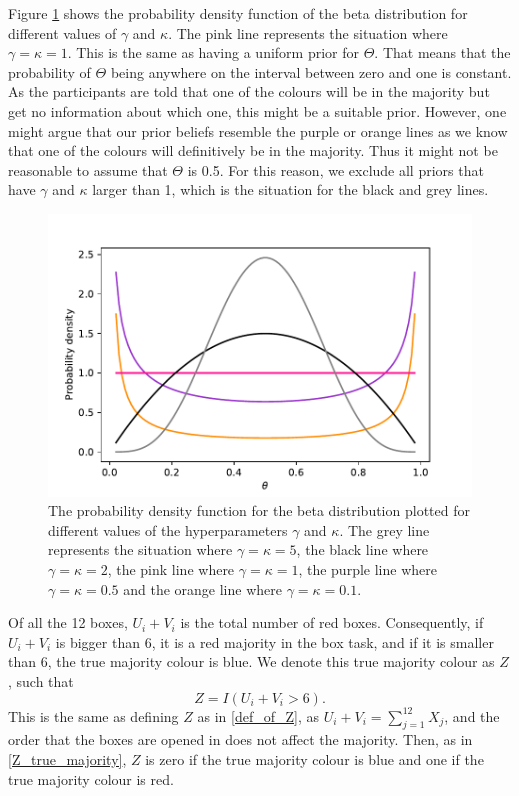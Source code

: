 Figure \ref{fig:pdf_beta_distr} shows the probability density function of the beta distribution for different values of $\gamma$ and $\kappa$. The pink line represents the situation where $\gamma=\kappa=1$. This is the same as having a uniform prior for $\Theta$. That means that the probability of $\Theta$ being anywhere on the interval between zero and one is constant. As the participants are told that one of the colours will be in the majority but get no information about which one, this might be a suitable prior.
However, one might argue that our prior beliefs resemble the purple or orange lines as we know that one of the colours will definitively be in the majority. Thus it might not be reasonable to assume that $\Theta$ is 0.5. For this reason, we exclude all priors that have $\gamma$ and $\kappa$ larger than 1, which is the situation for the black and grey lines. 

\begin{figure}
    \centering
    \includegraphics[scale=0.5]{pictures/beta_pdf.pdf}
    \caption[Probability Density for the Beta Distribution]{The probability density function for the beta distribution plotted for different values of the hyperparameters $\gamma$ and $\kappa$.
    The grey line represents the situation where $\gamma=\kappa=5$, the black line where $\gamma=\kappa=2$, the pink line where $\gamma=\kappa=1$, the purple line where $\gamma=\kappa=0.5$ and the orange line where $\gamma=\kappa=0.1$.
    }
    \label{fig:pdf_beta_distr}
\end{figure}


Of all the 12 boxes, $U_i+V_i$ is the total number of red boxes.
Consequently, if $U_i+V_i$ is bigger than 6, it is a red majority in the box task, and if it is smaller than 6, the true majority colour is blue. We denote this true majority colour as $Z$, such that
\begin{equation}
\label{def_of_Z_2}
    Z = I(U_i+V_i>6).
\end{equation}
This is the same as defining $Z$ as in \eqref{def_of_Z}, as $U_i+V_i = \sum_{j=1}^{12}X_j$, and the order that the boxes are opened in does not affect the majority. Then, as in \eqref{Z_true_majority}, $Z$ is zero if the true majority colour is blue and one if the true majority colour is red. 


